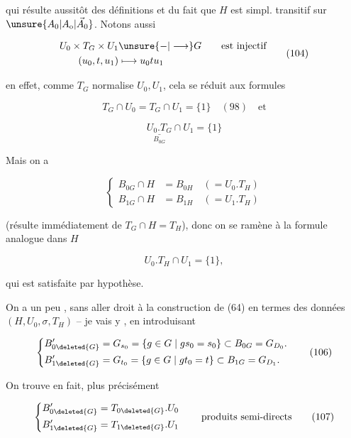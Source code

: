 
qui résulte aussitôt des définitions et du fait que $H$ est simpl. transitif sur $\unsure{A_0|A_{\mathrm{o}}|\vec{A}_0}$. Notons aussi

\[\begin{aligned}
U_0\times T_G\times U_1&\unsure{-|\longrightarrow}G\qquad\text{est injectif}\\
(u_0,t,u_1)&\longmapsto u_0tu_1
\end{aligned}\tag*{(104)}\]

en effet, comme $T_G$ normalise $U_0,U_1$, cela se réduit aux formules

\[T_G\cap U_0=T_G\cap U_1=\{1\}\quad(98)\quad\text{et}\]

\[\underset{B_{0G}}{\underline{U_0.T_G}}\cap U_1=\{1\}\tag*{(*)}\]

Mais on a

\[\left\{\begin{aligned}
B_{0G}\cap H&=B_{0H}\quad(=U_0.T_H)\\
B_{1G}\cap H&=B_{1H}\quad(=U_1.T_H)
\end{aligned}\right.\tag*{(105)}\]

(résulte immédiatement de $T_G\cap H=T_H$), donc on se  ramène à la formule analogue dans $H$

\[U_0.T_H\cap U_1=\{1\},\]

qui est satisfaite par hypothèse.

On a un peu , sans aller droit à la construction de (64) en termes des données $(H,U_0,\sigma,T_H)$ -- je vais y , en introduisant

\[\left\{\begin{aligned}
B'_{0\deleted{G}}&=G_{s_0}=\{g\in G\mid gs_0=s_0\}\subset B_{0G}=G_{D_0}.\\
B'_{1\deleted{G}}&=G_{t_0}=\{g\in G\mid gt_0=t\}\subset B_{1G}=G_{D_1}.
\end{aligned}\right.\tag*{(106)}\]

On trouve en fait, plus précisément

\[\left\{\begin{aligned}
B'_{0\deleted{G}}&=T_{0\deleted{G}}.U_0\\
B'_{1\deleted{G}}&=T_{1\deleted{G}}.U_1
\end{aligned}\right.\qquad\text{produits semi-directs}\tag*{(107)}\]

